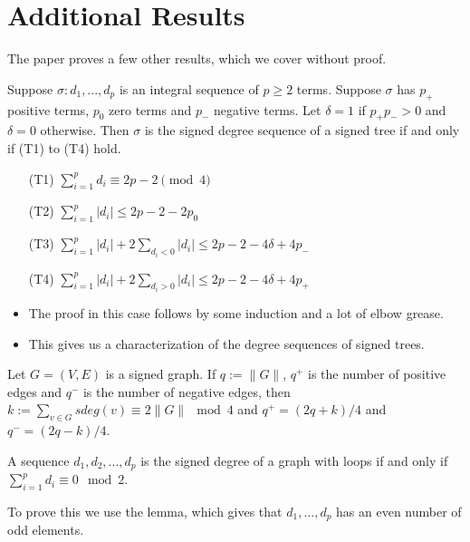 \section{Additional Results}

\begin{frame}
	The paper proves a few other results, which we cover without proof.
		\begin{theorem}
			Suppose $\sigma : d_1,...,d_p$ is an integral sequence of $p \geq 2$ terms. Suppose $\sigma$ has $p_+$ positive terms, $p_0$ zero terms and $p_-$ negative terms. Let $\delta = 1$ if $p_+p_- > 0$ and $\delta = 0$ otherwise. Then $\sigma$ is the signed degree sequence of a signed tree if and only if (T1) to (T4) hold.
			\begin{itemize}
				\item[(T1)] $\sum_{i = 1}^{p} d_i \equiv 2p - 2 \pmod 4$
				\item[(T2)] $\sum_{i = 1}^{p} \lvert d_i \rvert \le 2p - 2 - 2p_0$
				\item[(T3)] $\sum_{i = 1}^{p} \lvert d_i \rvert + 2\sum_{d_i < 0} \lvert d_i \rvert \leq 2p - 2 - 4\delta + 4p_-$
				\item[(T4)] $\sum_{i = 1}^{p} \lvert d_i \rvert + 2\sum_{d_i > 0} \lvert d_i \rvert \leq 2p - 2 - 4\delta + 4p_+$
			\end{itemize}
		\end{theorem}
	\begin{itemize}
		\item The proof in this case follows by some induction and a lot of elbow grease.
		\item This gives us a characterization of the degree sequences of signed trees.
	\end{itemize}
\end{frame}

\begin{frame}
	\begin{lemma}
		Let $G = (V,E)$ is a signed graph. If $q := \lVert G \rVert$, $q^+$ is the number of positive edges and $q^-$ is the number of negative edges, then $k := \sum_{v \in G} sdeg(v) \equiv 2\lVert G \rVert \mod 4$ and $q^+ = (2q+k)/4$ and $q^- = (2q-k)/4$.
	\end{lemma}
	\begin{theorem}
		A sequence $d_1, d_2, ..., d_p$ is the signed degree of a graph with loops if and only if $\sum_{i = 1}^{p} d_i \equiv 0 \mod 2$.
	\end{theorem}
	To prove this we use the lemma, which gives that $d_1,...,d_p$ has an even number of odd elements.
\end{frame}


